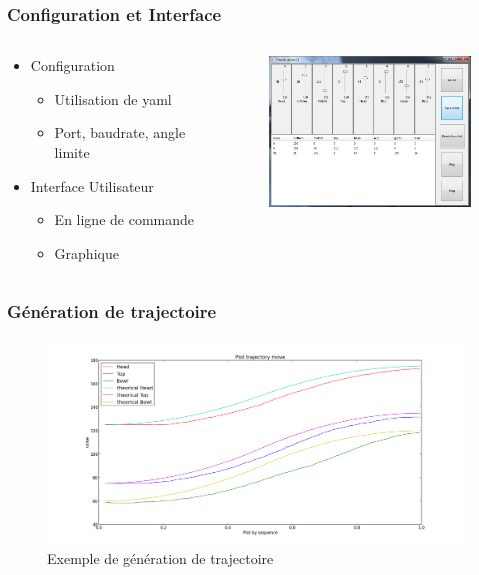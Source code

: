 \begin{frame}
  \frametitle{Configuration et Interface}
  \begin{columns}[T]
    \begin{column}{.4\textwidth}
      \begin{itemize}
        \item Configuration
          \begin{itemize}
            \item Utilisation de yaml
            \item Port, baudrate, angle limite
          \end{itemize}
        \item Interface Utilisateur
          \begin{itemize}
            \item En ligne de commande
            \item Graphique
          \end{itemize}
      \end{itemize}
    \end{column}
    \begin{column}{.6\textwidth}
      \begin{figure}[ht]
        \centering
        \includegraphics[width=6cm]{../img/gui.jpg}
      \end{figure}
    \end{column}
  \end{columns}
\end{frame}

\begin{frame}
  \frametitle{Génération de trajectoire}
            \begin{figure}
                \begin{center}
                    \includegraphics[width=11cm]{../img/TrajectoryPlot.png}
                \end{center}
                \caption{Exemple de génération de trajectoire}
            \end{figure}
\end{frame}
